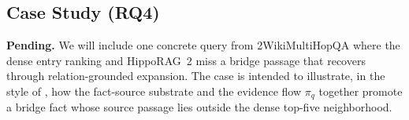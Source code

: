 \subsection{Case Study (RQ4)}
\label{sec:experiments:case}


\textbf{Pending.} We will include one concrete query from
2WikiMultiHopQA where the dense entry ranking and HippoRAG~2 miss a
bridge passage that \methodname{} recovers through relation-grounded
expansion. The case is intended to illustrate, in the style of
\citet{huang2026relink}, how the fact-source substrate and the
evidence flow $\pi_q$ together promote a bridge fact whose source
passage lies outside the dense top-five neighborhood.
